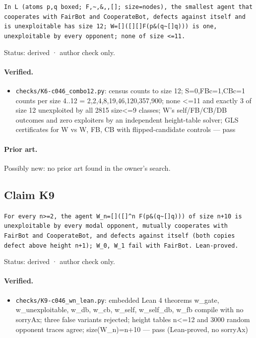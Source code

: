 \documentclass{article}
\begin{document}
\texttt{In L (atoms p,q boxed; F,\textasciitilde{},\&,\textbar{},[]; size=nodes), the smallest agent that cooperates with FairBot and CooperateBot, defects against itself and is unexploitable has size 12; W=[]([][]F\textbar{}(p\&(q\textbar{}\textasciitilde{}[]q))) is one, unexploitable by every opponent; none of size \textless{}=11.}

Status: derived · author check only.

\paragraph{Verified.}
\begin{itemize}
\item \texttt{checks/K6-c046\_combo12.py}: census counts to size 12; S=0,FBc=1,CBc=1 counts per size 4..12 = 2,2,4,8,19,46,120,357,900; none \textless{}=11 and exactly 3 of size 12 unexploited by all 2815 size\textless{}=9 classes; W's self/FB/CB/DB outcomes and zero exploiters by an independent height-table solver; GLS certificates for W vs W, FB, CB with flipped-candidate controls --- pass
\end{itemize}

\paragraph{Prior art.} Possibly new: no prior art found in the owner's search.

\subsection*{Claim K9}

\texttt{For every n\textgreater{}=2, the agent W\_n=[]([]\textasciicircum{}n F\textbar{}(p\&(q\textbar{}\textasciitilde{}[]q))) of size n+10 is unexploitable by every modal opponent, mutually cooperates with FairBot and CooperateBot, and defects against itself (both copies defect above height n+1); W\_0, W\_1 fail with FairBot. Lean-proved.}

Status: derived · author check only.

\paragraph{Verified.}
\begin{itemize}
\item \texttt{checks/K9-c046\_wn\_lean.py}: embedded Lean 4 theorems w\_gate, w\_unexploitable, w\_db, w\_cb, w\_self, w\_self\_db, w\_fb compile with no sorryAx; three false variants rejected; height tables n\textless{}=12 and 3000 random opponent traces agree; size(W\_n)=n+10 --- pass (Lean-proved, no sorryAx)
\end{itemize}
\end{document}
